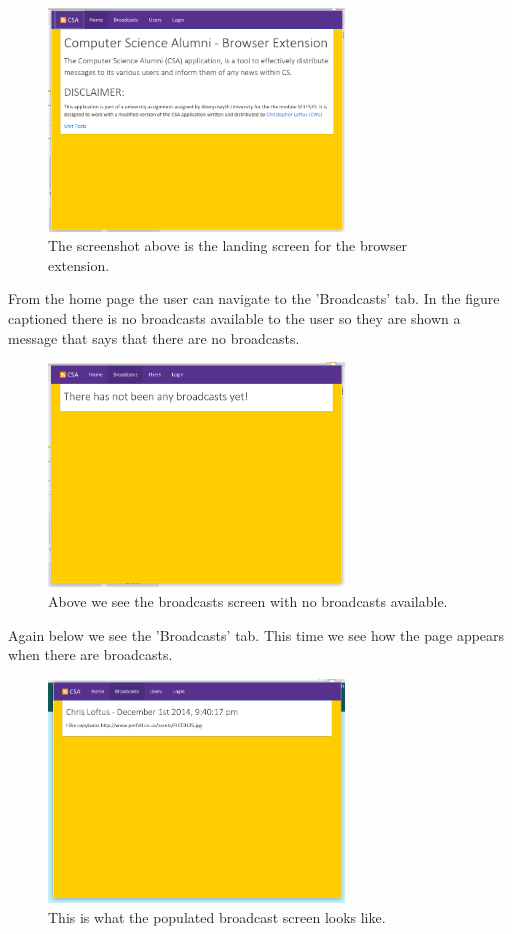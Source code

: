 \documentclass{article}
\begin{document}
\begin{figure}[H]
\centering
\includegraphics[width=0.7\textwidth]{homepage}
\caption{The screenshot above is the landing screen for the browser extension.}
\end{figure}

\newpage
From the home page the user can navigate to the 'Broadcasts' tab. In the figure captioned there is no broadcasts available to the user so they are shown a message that says that there are no broadcasts.\\

\begin{figure}[H]
\centering
\includegraphics[width=0.7\textwidth]{bcpage}
\caption{Above we see the broadcasts screen with no broadcasts available.}
\end{figure}

Again below we see the 'Broadcasts' tab. This time we see how the page appears when there are broadcasts.

\begin{figure}[H]
\centering
\includegraphics[width=0.7\textwidth]{populatebcpage}
\caption{This is what the populated broadcast screen looks like.}
\end{figure}
\end{document}
